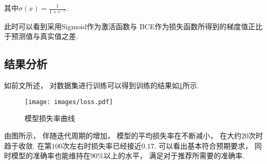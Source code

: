 其中$ \sigma(x)=\frac{1}{1+e^{-x}} $.

此时可以看到采用Sigmoid作为激活函数与
BCE作为损失函数所得到的梯度值正比于预测值与真实值之差.

\subsection{结果分析}

如前文所述，
对数据集进行训练可以得到训练的结果如\cref{fig:loss}所示.

\begin{figure}[!htbp]
	\centering
	\texttt{[image: images/loss.pdf]}
	\caption{模型损失率曲线}\label{fig:loss}
\end{figure}

由图所示，
伴随迭代周期的增加，
模型的平均损失率在不断减小，
在大约$20$次时趋于收敛.
在第$100$次左右时损失率已经接近$0.17$.
可以看出基本符合预期要求，
同时模型的准确率也能维持在90\%以上的水平，
满足对于推荐所需要的准确率.